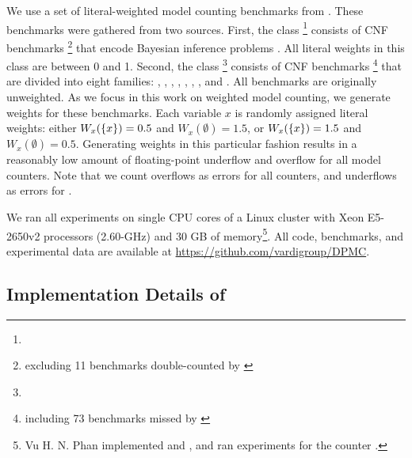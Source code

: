 We use a set of \benchmarkCountAltogether{} literal-weighted model counting benchmarks from \cite{DPV20}.
These benchmarks were gathered from two sources.
First, the \classBayes{} class%
\footnote{\urlBenchmarksBayes}
consists of \benchmarkCountBayes{} CNF benchmarks%
\footnote{excluding 11 benchmarks double-counted by \cite{DPV20}}
that encode Bayesian inference problems \cite{sang2005performing}.
All literal weights in this class are between 0 and 1. %
Second, the \classOther{} class%
\footnote{\urlBenchmarksOther}
consists of \benchmarkCountOther{} CNF benchmarks%
\footnote{including 73 benchmarks missed by \cite{DPV20}}
that are divided into eight families: \famBmc, \famCircuit, \famConfig, \famHandmade, \famPlanning, \famQif, \famRandom, and \famSchedule{} \cite{clarke2001bounded,sinz2003formal,palacios2009compiling,klebanov2013sat}.
All \classOther{} benchmarks are originally unweighted.
As we focus in this work on weighted model counting, we generate weights for these benchmarks.
Each variable $x$ is randomly assigned literal weights: either $W_x(\left\{ x \right\}) = 0.5$ and $W_x(\emptyset) = 1.5$, or $W_x(\left\{ x \right\}) = 1.5$ and $W_x(\emptyset) = 0.5$.
Generating weights in this particular fashion results in a reasonably low amount of floating-point underflow and overflow for all model counters.
Note that we count overflows as errors for all counters, and underflows as errors for \Dmc{}.

We ran all experiments on single CPU cores of a Linux cluster with Xeon E5-2650v2 processors (2.60-GHz) and 30 GB of memory\footnote{
Vu H. N. Phan implemented \Htb{} and \Dmc{}, and ran experiments for the counter .}.
All code, benchmarks, and experimental data are available at \url{https://github.com/vardigroup/DPMC}.


\subsection{Implementation Details of }
\label{sec:dpmc:experiments:impl}

